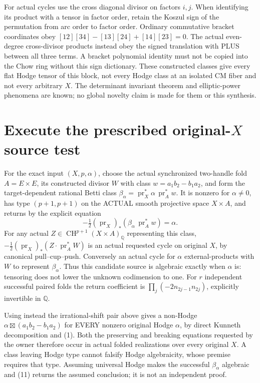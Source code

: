 \documentclass[11pt]{article}
\newcommand{\Q}{\mathbb Q}
\newcommand{\CH}{\operatorname{CH}}
\begin{document}
For actual cycles use the cross diagonal divisor on factors $i,j$.
When identifying its product with a tensor in factor order, retain the
Koszul sign of the permutation from arc order to factor order. Ordinary
commutative bracket coordinates obey
$[12][34]-[13][24]+[14][23]=0$.
The actual even-degree cross-divisor products instead obey the signed
translation with PLUS between all three terms. A bracket polynomial
identity must not be copied into the Chow ring without this sign dictionary.
These constructed classes give every flat Hodge tensor of this block,
not every Hodge class at an isolated CM fiber and not every arbitrary $X$.
The determinant invariant theorem and elliptic-power phenomena are known;
no global novelty claim is made for them or this synthesis.

\section{Execute the prescribed original-$X$ source test}
For the exact input $(X,p,\alpha)$, choose the actual synchronized
two-handle fold $A=E\times E$, its constructed divisor $W$ with class
$w=a_1b_2-b_1a_2$, and form the target-dependent rational Betti class
$\beta_\alpha=\operatorname{pr}_X^*\alpha\,\operatorname{pr}_A^*w$.
It is nonzero for $\alpha\ne0$, has type $(p+1,p+1)$ on the ACTUAL
smooth projective space $X\times A$, and returns by the explicit equation
\[
 -\tfrac12(\operatorname{pr}_X)_*
 (\beta_\alpha\,\operatorname{pr}_A^*w)=\alpha.\tag{11}
\]
For any actual $Z\in\CH^{p+1}(X\times A)_\Q$ representing this class,
$-\tfrac12(\operatorname{pr}_X)_*(Z\cdot\operatorname{pr}_A^*W)$
is an actual requested cycle on original $X$, by canonical pull--cup--push.
Conversely an actual cycle for $\alpha$ external-products with $W$ to
represent $\beta_\alpha$. Thus this candidate source is algebraic exactly
when $\alpha$ is: tensoring does not lower the unknown codimension to one.
For $r$ independent successful paired folds the return coefficient is
$\prod_j(-2n_{2j-1}n_{2j})$, explicitly invertible in $\Q$.

Using instead the irrational-shift pair above gives a non-Hodge
$\alpha\boxtimes(a_1b_2-b_1a_2)$ for EVERY nonzero original Hodge
$\alpha$, by direct Kunneth decomposition and (1). Both the preserving
and breaking equations requested by the owner therefore occur in actual
folded realizations over every original $X$. A class leaving Hodge type
cannot falsify Hodge algebraicity, whose premise requires that type.
Assuming universal Hodge makes the successful $\beta_\alpha$ algebraic
and (11) returns the assumed conclusion; it is not an independent proof.
\end{document}
